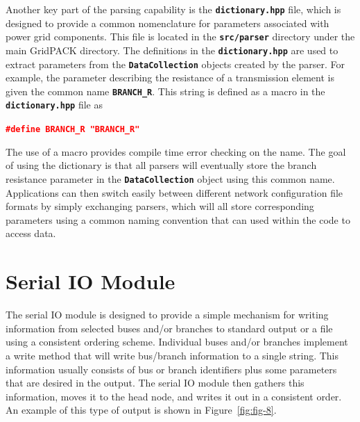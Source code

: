 \documentclass[12pt]{report} %
\begin{document}
Another key part of the parsing capability is the \texttt{\textbf{dictionary.hpp}} file, which is designed to provide a common nomenclature for parameters associated with power grid components. This file is located in the \texttt{\textbf{src/parser}} directory under the main GridPACK directory. The definitions in the \texttt{\textbf{dictionary.hpp}} are used to extract parameters from the \texttt{\textbf{DataCollection}} objects created by the parser. For example, the parameter describing the resistance of a transmission element is given the common name \texttt{\textbf{BRANCH\_R}}. This string is defined as a macro in the \texttt{\textbf{dictionary.hpp}} file as

\textcolor{red}{\texttt{\textbf{\#define BRANCH\_R "BRANCH\_R"}}}

The use of a macro provides compile time error checking on the name. The goal of using the dictionary is that all parsers will eventually store the branch resistance parameter in the \texttt{\textbf{DataCollection}} object using this common name. Applications can then switch easily between different network configuration file formats by simply exchanging parsers, which will all store corresponding parameters using a common naming convention that can used within the code to access data.

\section{Serial IO Module}

The serial IO module is designed to provide a simple mechanism for writing information from selected buses and/or branches to standard output or a file using a consistent ordering scheme. Individual buses and/or branches implement a write method that will write bus/branch information to a single string. This information usually consists of bus or branch identifiers plus some parameters that are desired in the output. The serial IO module then gathers this information, moves it to the head node, and writes it out in a consistent order. An example of this type of output is shown in Figure~\ref{fig:fig-8}.

\end{document}
